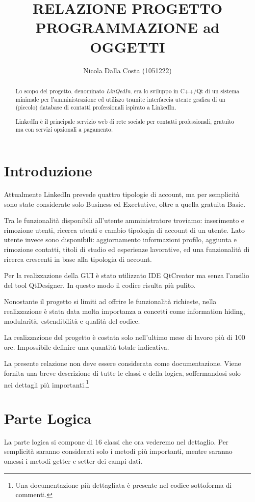 \documentclass[a4paper]{article}
\title{RELAZIONE PROGETTO\\PROGRAMMAZIONE ad OGGETTI}
\author{Nicola Dalla Costa (1051222)}
\date{}
\begin{document}
\maketitle
\raggedbottom

\renewcommand\abstractname{\textit{Abstract}}
\begin{abstract}
\noindent Lo scopo del progetto, denominato \textit{LinQedIn}, era lo sviluppo in C++/Qt di un sistema minimale per l'amministrazione ed utilizzo tramite interfaccia utente grafica di un (piccolo) database di contatti professionali ispirato a LinkedIn. 

LinkedIn è il principale servizio web di rete sociale per contatti professionali, gratuito ma con servizi opzionali a pagamento.
\end{abstract}

\section*{Introduzione}
Attualmente LinkedIn prevede quattro tipologie di account, ma per semplicità sono state considerate solo Business ed Exectutive, oltre a quella gratuita Basic.

Tra le funzionalità disponibili all'utente amministratore troviamo: inserimento e rimozione utenti, ricerca utenti e cambio tipologia di account di un utente. Lato utente invece sono disponibili: aggiornamento informazioni profilo, aggiunta e rimozione contatti, titoli di studio ed esperienze lavorative, ed una funzionalità di ricerca crescenti in base alla tipologia di account.

Per la realizzazione della GUI è stato utilizzato IDE QtCreator ma senza l'ausilio del tool QtDesigner. In questo modo il codice risulta più pulito.

Nonostante il progetto si limiti ad offrire le funzionalità richieste, nella realizzazione è stata data molta importanza a concetti come information hiding, modularità, estendibilità e qualità del codice.

La realizzazione del progetto è costata solo nell'ultimo mese di lavoro più di 100 ore. Impossibile definire una quantità totale indicativa.

La presente relazione non deve essere considerata come documentazione. Viene fornita una breve descrizione di tutte le classi e della logica, soffermandosi solo nei dettagli più importanti.\footnote{Una documentazione più dettagliata è presente nel codice sottoforma di commenti.}

\section*{Parte Logica}
La parte logica si compone di 16 classi che ora vederemo nel dettaglio. Per semplicità saranno considerati solo i metodi più importanti, mentre saranno omessi i metodi getter e setter dei campi dati.
\end{document}
